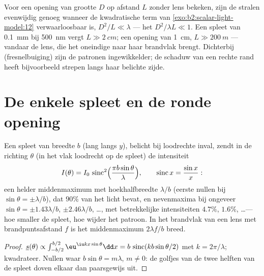 \begin{remark}\label{rem:b2:diffraction:fresnelnumber}
Voor een opening van grootte $D$ op afstand $L$ zonder lens bekeken, zijn de
stralen evenwijdig genoeg wanneer de kwadratische term van
\cref{exo:b2:scalar-light-model:12} verwaarloosbaar is, $D^2/L \ll \lambda$ ---
het \emph{} $D^2/\lambda L \ll 1$. Een spleet van \qty{0.1}{mm} bij
\qty{500}{nm} vergt $L \gg \qty{2}{cm}$; een opening van \qty{1}{cm},
$L \gg \qty{200}{m}$ ---
vandaar de lens, die het oneindige naar haar brandvlak brengt. Dichterbij
(fresnelbuiging) zijn de patronen ingewikkelder; de schaduw van een
rechte rand heeft bijvoorbeeld strepen langs haar belichte zijde.
\end{remark}

\section{De enkele spleet en de ronde opening}

\begin{proposition}\label{prop:b2:diffraction:slit}
Een spleet van breedte $b$ (lang langs $y$), belicht bij loodrechte inval, zendt in
de richting $\theta$ (in het vlak loodrecht op de spleet) de
intensiteit
\[
I(\theta) = I_0\,\operatorname{sinc}^2\Bigl(\frac{\pi b\sin\theta}\lambda\Bigr) , \qquad \operatorname{sinc}x = \frac{\sin x}x :
\]
een helder middenmaximum met hoekhalfbreedte $\lambda/b$ (eerste nullen bij
$\sin\theta = \pm\lambda/b$), dat $90\%$ van het licht bevat, en nevenmaxima
bij ongeveer $\sin\theta = \pm1.43\lambda/b$, $\pm2.46\lambda/b$, \dots, met
betrekkelijke
intensiteiten $4.7\%$, $1.6\%$, \dots --- hoe smaller de spleet, hoe wijder
het patroon. In het brandvlak van een lens met brandpuntsafstand $f$ is het
middenmaximum $2\lambda f/b$ breed.
\end{proposition}

\begin{proof}
$\underline s(\theta) \propto \int_{-b/2}^{b/2}\eu^{\iu kx\sin\theta}\dd x = b\,\operatorname{sinc}(kb\sin\theta/2)$
met $k = 2\pi/\lambda$; kwadrateer. Nullen waar $b\sin\theta = m\lambda$,
$m \ne 0$: de
golfjes van de twee helften van de spleet doven elkaar dan paarsgewijs uit.
\end{proof}


